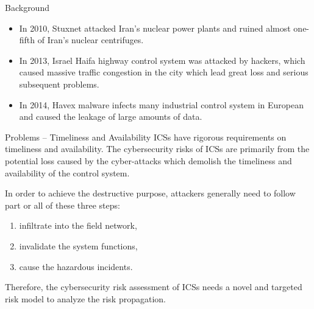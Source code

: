 \begin{frame}{Background}\label{Introduction: ICSs are under Attacks}
    \begin{itemize}
      \item In 2010, Stuxnet attacked Iran's nuclear power plants and ruined almost one-fifth of Iran's nuclear centrifuges.
      \item In 2013, Israel Haifa highway control system  was attacked by hackers, which caused massive traffic congestion in the city which lead great loss and serious subsequent problems.
      \item In 2014, Havex malware infects many industrial control system in European  and caused the leakage of large amounts of data.
    \end{itemize}

    \begin{minipage}[c][][t]{0.6\textwidth}
      
    \end{minipage}
    \begin{minipage}[c][][t]{0.35\textwidth}
    \end{minipage}
\end{frame}

\begin{frame}{Problems -- Timeliness and Availability}\label{Introduction: Problem of Timeliness and Availability}
    ICSs have rigorous requirements on timeliness and availability. The cybersecurity risks of ICSs are primarily from the potential loss caused by the cyber-attacks which demolish the timeliness and availability of the control system.

    In order to achieve the destructive purpose, attackers generally need to follow part or all of these three steps:
    \begin{enumerate}
      \item infiltrate into the field network,
      \item invalidate the system functions,
      \item cause the hazardous incidents.
    \end{enumerate}

    Therefore, the cybersecurity risk assessment of ICSs needs  a novel and targeted risk model to analyze the risk propagation.
\end{frame}

